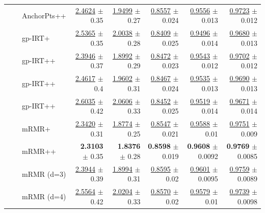 \begin{longtable}{llp{}rrrrr}
 &  & AnchorPts++ & \underline{2.4624} {\scriptsize $\pm$ 0.35} & \underline{1.9499} {\scriptsize $\pm$ 0.27} & \underline{0.8557} {\scriptsize $\pm$ 0.024} & \underline{0.9556} {\scriptsize $\pm$ 0.013} & \underline{0.9723} {\scriptsize $\pm$ 0.012} \\
 &  & gp-IRT+ & \underline{2.5365} {\scriptsize $\pm$ 0.35} & \underline{2.0038} {\scriptsize $\pm$ 0.28} & \underline{0.8409} {\scriptsize $\pm$ 0.025} & \underline{0.9496} {\scriptsize $\pm$ 0.014} & \underline{0.9680} {\scriptsize $\pm$ 0.013} \\
 &  & gp-IRT++ & \underline{2.3946} {\scriptsize $\pm$ 0.37} & \underline{1.8992} {\scriptsize $\pm$ 0.29} & \underline{0.8472} {\scriptsize $\pm$ 0.023} & \underline{0.9543} {\scriptsize $\pm$ 0.012} & \underline{0.9702} {\scriptsize $\pm$ 0.012} \\
 &  & gp-IRT++ & \underline{2.4617} {\scriptsize $\pm$ 0.4} & \underline{1.9602} {\scriptsize $\pm$ 0.31} & \underline{0.8467} {\scriptsize $\pm$ 0.024} & \underline{0.9535} {\scriptsize $\pm$ 0.013} & \underline{0.9690} {\scriptsize $\pm$ 0.013} \\
 &  & gp-IRT++ & \underline{2.6035} {\scriptsize $\pm$ 0.42} & \underline{2.0606} {\scriptsize $\pm$ 0.33} & \underline{0.8452} {\scriptsize $\pm$ 0.025} & \underline{0.9519} {\scriptsize $\pm$ 0.014} & \underline{0.9671} {\scriptsize $\pm$ 0.014} \\
 &  & mRMR+ & \underline{2.3420} {\scriptsize $\pm$ 0.31} & \underline{1.8774} {\scriptsize $\pm$ 0.25} & \underline{0.8547} {\scriptsize $\pm$ 0.021} & \underline{0.9588} {\scriptsize $\pm$ 0.01} & \underline{0.9751} {\scriptsize $\pm$ 0.009} \\
 &  & mRMR++ & \textbf{2.3103} {\scriptsize $\pm$ 0.35} & \textbf{1.8376} {\scriptsize $\pm$ 0.28} & \textbf{0.8598} {\scriptsize $\pm$ 0.019} & \textbf{0.9608} {\scriptsize $\pm$ 0.0092} & \textbf{0.9769} {\scriptsize $\pm$ 0.0085} \\
 &  & mRMR (d=3) & \underline{2.3944} {\scriptsize $\pm$ 0.39} & \underline{1.8994} {\scriptsize $\pm$ 0.31} & \underline{0.8595} {\scriptsize $\pm$ 0.02} & \underline{0.9601} {\scriptsize $\pm$ 0.0095} & \underline{0.9759} {\scriptsize $\pm$ 0.0089} \\
 &  & mRMR (d=4) & \underline{2.5564} {\scriptsize $\pm$ 0.42} & \underline{2.0204} {\scriptsize $\pm$ 0.33} & \underline{0.8570} {\scriptsize $\pm$ 0.02} & \underline{0.9579} {\scriptsize $\pm$ 0.01} & \underline{0.9739} {\scriptsize $\pm$ 0.0098} \\

\end{longtable}
